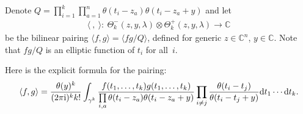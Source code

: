 \documentclass[pdftex]{sigma}
\numberwithin{equation}{section}
\begin{document}
\begin{Definition} Denote $Q=\prod\limits_{i=1}^k\prod\limits_{a=1}^n\theta(t_i-z_a)\theta(t_i-z_a+y)$ and let
 \begin{gather*}
 \langle \ , \ \rangle\colon \ \Theta^-_k(z,y,\lambda)\otimes\Theta^+_k(z,y,\lambda)\to
 \mathbb C
 \end{gather*}
 be the bilinear pairing $ \langle f,g\rangle= \langle fg/Q\rangle $, defined for generic $z\in\mathbb C^n$, $y\in\mathbb C$. Note that $fg/Q$ is an elliptic function of $t_i$ for all~$i$.
\end{Definition}
Here is the explicit formula for the pairing:
\begin{gather}\label{e-pairing}
\langle f,g\rangle=\frac{\theta(y)^k}{(2\pi{\rm i})^kk!}\int_{\gamma^k}\frac{f(t_1,\dots,t_k)g(t_1,\dots,t_k)}{\prod\limits_{i,a}\theta(t_i-z_a)\theta(t_i-z_a+y)}\prod_{i\neq j}\frac{\theta(t_i-t_j)}{\theta(t_i-t_j+y)}
{\rm d}t_1\cdots {\rm d}t_k.
\end{gather}
\end{document}
